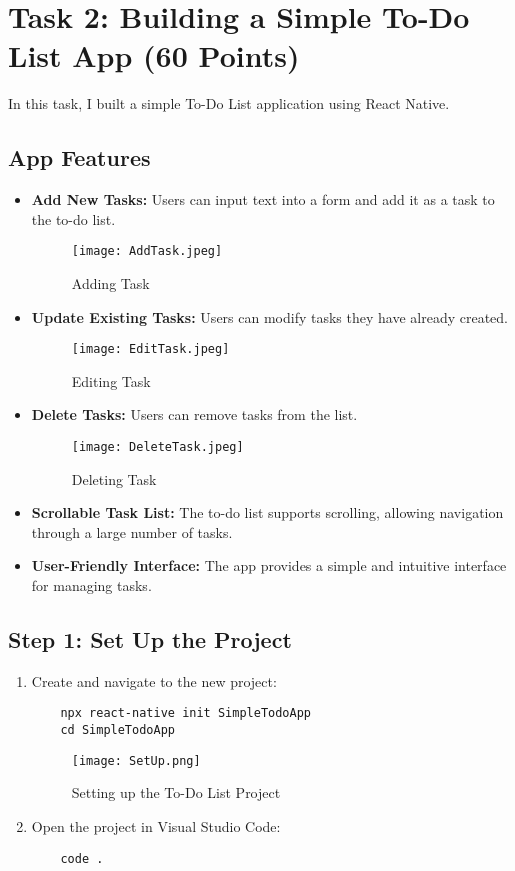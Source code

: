 \documentclass{article}
\begin{document}
\section{Task 2: Building a Simple To-Do List App (60 Points)}
In this task, I built a simple To-Do List application using React Native.

\subsection{App Features}
\begin{itemize}
    \item \textbf{Add New Tasks:} Users can input text into a form and add it as a task to the to-do list.
    \begin{figure}[H]
        \centering
        \texttt{[image: AddTask.jpeg]}
        \caption{Adding Task}
    \end{figure}

    \item \textbf{Update Existing Tasks:} Users can modify tasks they have already created.
    \begin{figure}[H]
        \centering
        \texttt{[image: EditTask.jpeg]}
        \caption{Editing Task}
    \end{figure}
    
    
    \item \textbf{Delete Tasks:} Users can remove tasks from the list.
    \begin{figure}[H]
        \centering
        \texttt{[image: DeleteTask.jpeg]}
        \caption{Deleting Task}
    \end{figure}
  
    
    \item \textbf{Scrollable Task List:} The to-do list supports scrolling, allowing navigation through a large number of tasks.

    \item \textbf{User-Friendly Interface:} The app provides a simple and intuitive interface for managing tasks.
\end{itemize}

\subsection{Step 1: Set Up the Project}
\begin{enumerate}
    \item Create and navigate to the new project:
    \begin{verbatim}
    npx react-native init SimpleTodoApp
    cd SimpleTodoApp
    \end{verbatim}
    \begin{figure}[H]
        \centering
        \texttt{[image: SetUp.png]}
        \caption{Setting up the To-Do List Project}
    \end{figure}
    
    \item Open the project in Visual Studio Code:
    \begin{verbatim}
    code .
    \end{verbatim}
\end{enumerate}
\end{document}
